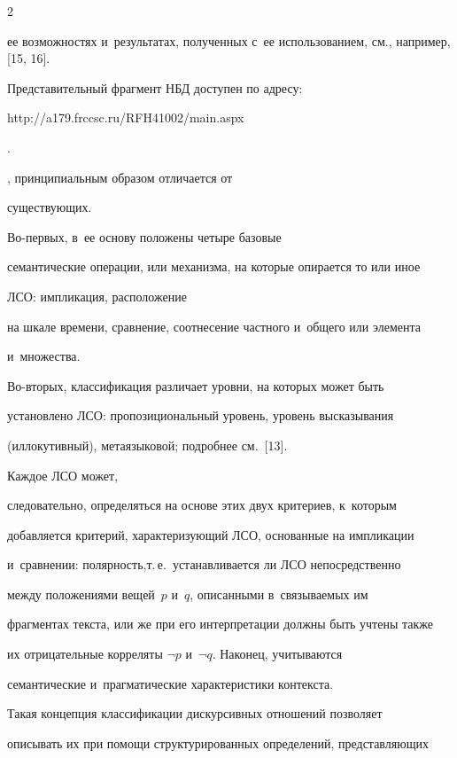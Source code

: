 \begin{multicols}{2}
{ее возможностях и~результатах, полученных с~ее использованием, см., например, [15, 16]. 


Представительный фрагмент НБД доступен по адресу: {\sf 


http://a179.frccsc.ru/RFH41002/main.aspx}.}, принципиальным образом отличается от 


существующих. 





Во-пер\-вых, в~ее основу положены четыре базовые 


семантические операции, или механизма, на которые опирается то или иное 


ЛСО: импликация, расположение 


на шкале времени, сравнение, соотнесение частного и~общего или элемента 


и~множества. 


   


   


   Во-вто\-рых, классификация различает уровни, на которых может быть 


установлено ЛСО: пропозициональный уровень, уровень высказывания 


(иллокутивный), метаязыковой; подробнее см.~[13]. 





Каждое ЛСО может, 


следовательно, определяться на основе этих двух критериев, к~которым 


добавляется критерий, характеризующий ЛСО, основанные на импликации 


и~сравнении: полярность,\linebreak т.\,е.\ устанавливается ли ЛСО непосредственно 


между положениями вещей~$p$ и~$q$, описанными в~связываемых им 


фрагментах текста, или же при его интерпретации должны быть учтены также 


их \mbox{отрицательные} корреляты $\neg p$ и~$\neg q$. Наконец, учитываются 


семантические и~прагматические характеристики контекста.


   


   Такая концепция классификации дискурсивных отношений позволяет 


описывать их при помощи структурированных определений, представляющих 



\end{multicols}
